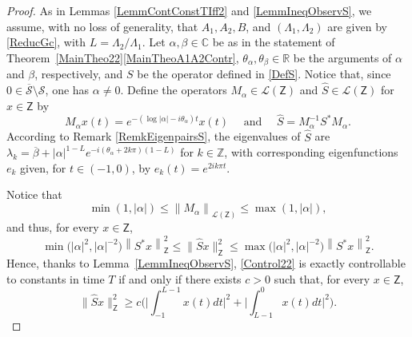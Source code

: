 \documentclass[10pt]{article}
\theoremstyle{plain}
\theoremstyle{definition}
\newcommand{\norm}[1]{\left\lVert #1\right\lVert}
\newcommand{\abs}[1]{\left\lvert #1\right \rvert}
\newcommand{\bnorm}[1]{\bigl\lVert #1\bigr\lVert}
\newcommand{\bgabs}[1]{\biggl\lvert #1\biggr \rvert}
\numberwithin{equation}{section}\numberwithin{figure}{section}\emergencystretch=3em
\begin{document}
\begin{proof}
As in Lemmas \ref{LemmContConstTIff2} and \ref{LemmIneqObservS}, we assume, with no loss of generality, that $A_1, A_2, B$, and $(\Lambda_1, \Lambda_2)$ are given by \eqref{ReducGc}, with $L = \Lambda_2 / \Lambda_1$. Let $\alpha, \beta \in \mathbb C$ be as in the statement of Theorem~\ref{MainTheo22}\eqref{MainTheoA1A2Contr}, $\theta_\alpha, \theta_\beta \in \mathbb R$ be the arguments of $\alpha$ and $\beta$, respectively, and $S$ be the operator defined in \eqref{DefS}. Notice that, since $0 \in \overline{\mathcal S}\setminus \mathcal S$, one has $\alpha \neq 0$. Define the operators $M_\alpha \in \mathcal L(\mathsf Z)$ and $\widehat S \in \mathcal L(\mathsf Z)$ for $x \in \mathsf Z$ by
\[M_\alpha x(t) = e^{-(\log\abs{\alpha} - i \theta_\alpha) t} x(t) \quad \text{ and } \quad \widehat S = M_{\alpha}^{-1} S^\ast M_\alpha.\]
According to Remark \ref{RemkEigenpairsS}, the eigenvalues of $\widehat S$ are $\lambda_k = \overline\beta + \abs{\alpha}^{1 - L} e^{- i (\theta_\alpha + 2 k \pi)(1 - L)}$ for $k \in \mathbb Z$, with corresponding eigenfunctions $e_k$ given, for $t \in (-1, 0)$, by $e_k(t) = e^{2 i k \pi t}$.

Notice that
\[
\min(1, \abs{\alpha}) \leq \norm{M_\alpha}_{\mathcal L(\mathsf Z)} \leq \max(1, \abs{\alpha}),
\]
and thus, for every $x \in \mathsf Z$,
\[
\min\bigl(\abs{\alpha}^2, \abs{\alpha}^{-2}\bigr) \norm{S^\ast x}_{\mathsf Z}^2 \leq \bnorm{\widehat S x}_{\mathsf Z}^2 \leq \max\bigl(\abs{\alpha}^2, \abs{\alpha}^{-2}\bigr) \norm{S^\ast x}_{\mathsf Z}^2.
\]
Hence, thanks to Lemma~\ref{LemmIneqObservS}, \eqref{Control22} is exactly controllable to constants in time $T$ if and only if there exists $c > 0$ such that, for every $x \in \mathsf Z$,
\begin{equation}
\label{IneqObservSHat}
\bnorm{\widehat S x}_{\mathsf Z}^2 \geq c \biggl(\bgabs{\int_{-1}^{L-1} x(t) dt}^2 + \bgabs{\int_{L-1}^{0} x(t) dt}^2\biggr).
\end{equation}


\end{proof}
\end{document}
